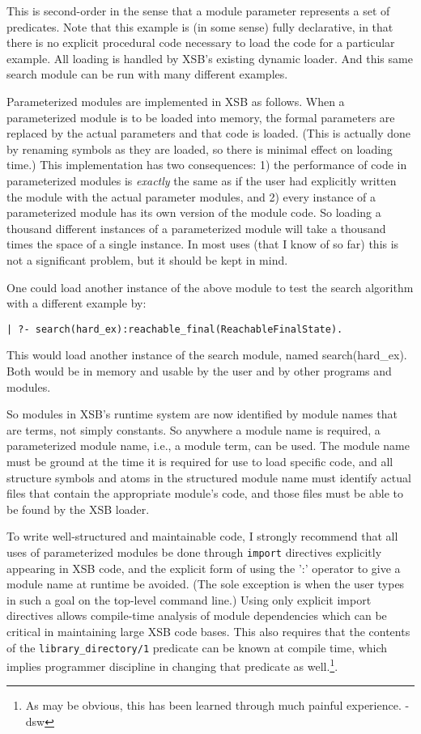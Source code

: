 This is second-order in the sense that a module parameter represents a
set of predicates.  Note that this example is (in some sense) fully
declarative, in that there is no explicit procedural code necessary to
load the code for a particular example.  All loading is handled by
XSB's existing dynamic loader.  And this same search module can be
run with many different examples.

Parameterized modules are implemented in XSB as follows.  When a
parameterized module is to be loaded into memory, the formal
parameters are replaced by the actual parameters and that code is
loaded.  (This is actually done by renaming symbols as they are
loaded, so there is minimal effect on loading time.)  This
implementation has two consequences: 1) the performance of code in
parameterized modules is {\em exactly} the same as if the user had
explicitly written the module with the actual parameter modules, and
2) every instance of a parameterized module has its own version of the
module code.  So loading a thousand different instances of a
parameterized module will take a thousand times the space of a single
instance.  In most uses (that I know of so far) this is not a
significant problem, but it should be kept in mind.

One could load another instance of the above module to test the search
algorithm with a different example by:
\begin{verbatim}
| ?- search(hard_ex):reachable_final(ReachableFinalState).
\end{verbatim}
This would load another instance of the search module, named
search(hard\_ex).  Both would be in memory and usable by the user and
by other programs and modules.

So modules in XSB's runtime system are now identified by module names
that are terms, not simply constants.  So anywhere a module name is
required, a parameterized module name, i.e., a module term, can be
used.  The module name must be ground at the time it is required for
use to load specific code, and all structure symbols and atoms in the
structured module name must identify actual files that contain the
appropriate module's code, and those files must be able to be found by
the XSB loader.

To write well-structured and maintainable code, I strongly recommend
that all uses of parameterized modules be done through {\tt import}
directives explicitly appearing in XSB code, and the explicit form of
using the ':' operator to give a module name at runtime be avoided.
(The sole exception is when the user types in such a goal on the
top-level command line.) Using only explicit import directives allows
compile-time analysis of module dependencies which can be critical in
maintaining large XSB code bases. This also requires that the contents
of the {\tt library\_directory/1} predicate can be known at compile
time, which implies programmer discipline in changing that predicate
as well.\footnote{As may be obvious, this has been learned through
  much painful experience. -dsw}.

